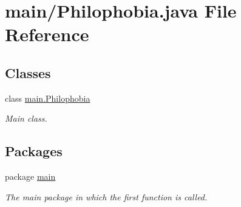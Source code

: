 \hypertarget{a00052}{\section{main/\-Philophobia.java File Reference}
\label{a00052}
}
\subsection*{Classes}
\begin{DoxyCompactItemize}
\item 
class \hyperlink{a00017}{main.\-Philophobia}
\begin{DoxyCompactList}\small\item\em Main class. \end{DoxyCompactList}\end{DoxyCompactItemize}
\subsection*{Packages}
\begin{DoxyCompactItemize}
\item 
package \hyperlink{a00085}{main}
\begin{DoxyCompactList}\small\item\em The main package in which the first function is called. \end{DoxyCompactList}\end{DoxyCompactItemize}
